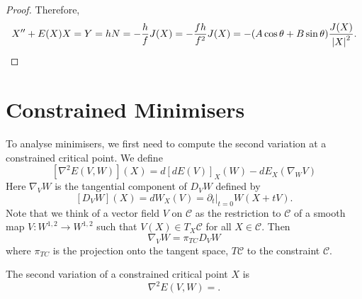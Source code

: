 \documentclass[12pt]{article}
\begin{document}
\begin{proof}
Therefore,
\[
X'' + E(X) X = Y = hN = -\frac{h}{f} J(X) = -\frac{fh}{f^2} J(X) = -(A \cos\theta + B \sin\theta) \frac{J(X)}{\left|{X}\right|^2}.
\]
\end{proof}

\section{Constrained Minimisers}

To analyse minimisers, we first need to compute the second variation at a constrained critical point. We define
\[
[\nabla^2 E(V, W)] (X) = d[dE(V)]_X (W) - dE_X(\nabla_W V)
\]
Here \(\nabla_V W\) is the tangential component of \(D_V W\) defined by
\[
[D_V W] (X) = dW_X(V) = \partial_t|_{t=0} W(X + t V).
\]
Note that we think of a vector field \(V\) on \(\mathcal{C}\) as the restriction to \(\mathcal{C}\) of a smooth map \(V : W^{1,2} \to W^{1,2}\) such that \(V(X) \in T_X \mathcal{C}\) for all \(X \in \mathcal{C}\). Then
\[
\nabla_V W = \pi_{TC} D_V W
\]
where \(\pi_{TC}\) is the projection onto the tangent space, \(T\mathcal{C}\) to the constraint \(\mathcal{C}\).

\begin{lem}
\label{lem:second_var}
The second variation of a constrained critical point \(X\) is
\[
\nabla^2 E (V, W) = .
\]
\end{lem}
\end{document}
